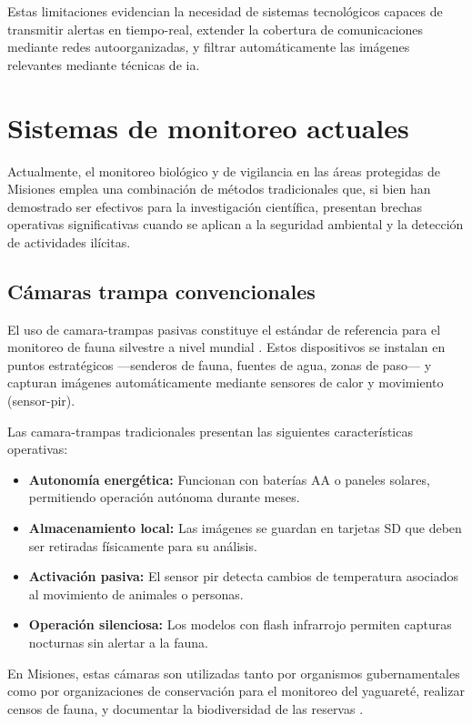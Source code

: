 \documentclass[a4paper, 12pt]{report}
\begin{document}
Estas limitaciones evidencian la necesidad de sistemas tecnológicos capaces de
transmitir alertas en \gls{tiempo-real}, extender la cobertura de comunicaciones
mediante redes autoorganizadas, y filtrar automáticamente las imágenes relevantes
mediante técnicas de \gls{ia}.

\section{Sistemas de monitoreo actuales}

Actualmente, el monitoreo biológico y de vigilancia en las áreas protegidas de
Misiones emplea una combinación de métodos tradicionales que, si bien han
demostrado ser efectivos para la investigación científica, presentan brechas
operativas significativas cuando se aplican a la seguridad ambiental y la
detección de actividades ilícitas.

\subsection{Cámaras trampa convencionales}

El uso de \glspl{camara-trampa} pasivas constituye el estándar de referencia
para el monitoreo de fauna silvestre a nivel mundial \cite{steenweg2017scaling}.
Estos dispositivos se instalan en puntos estratégicos ---senderos de fauna,
fuentes de agua, zonas de paso--- y capturan imágenes automáticamente mediante
sensores de calor y movimiento (\gls{sensor-pir}).

Las \glspl{camara-trampa} tradicionales presentan las siguientes características
operativas:

\begin{itemize}
  \item \textbf{Autonomía energética:} Funcionan con baterías AA o paneles
    solares, permitiendo operación autónoma durante meses.
  \item \textbf{Almacenamiento local:} Las imágenes se guardan en tarjetas
    SD que deben ser retiradas físicamente para su análisis.
  \item \textbf{Activación pasiva:} El sensor \gls{pir} detecta cambios de
    temperatura asociados al movimiento de animales o personas.
  \item \textbf{Operación silenciosa:} Los modelos con flash infrarrojo
    permiten capturas nocturnas sin alertar a la fauna.
\end{itemize}

En Misiones, estas cámaras son utilizadas tanto por organismos gubernamentales
como por organizaciones de conservación para el monitoreo del yaguareté,
realizar censos de fauna, y documentar la biodiversidad de las reservas
\cite{vidasilvestre2024censo}.
\end{document}
